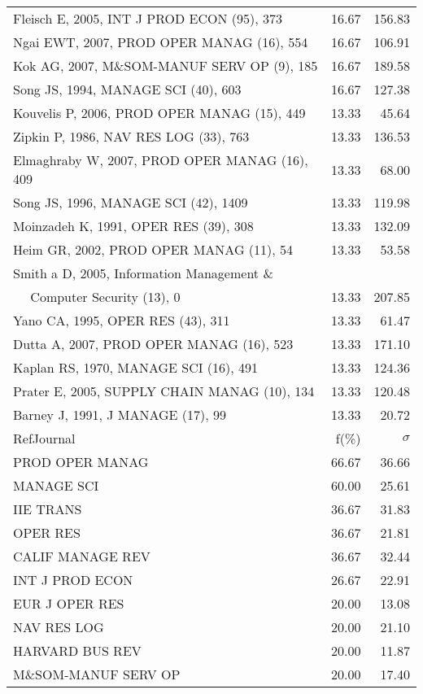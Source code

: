 \documentclass[a4paper,11pt]{report}
\begin{document}
\begin{landscape}
\begin{table}[!ht]
{\begin{tabular}{|l r r|}
Fleisch E, 2005, INT J PROD ECON (95), 373 & 16.67 & 156.83\\
Ngai EWT, 2007, PROD OPER MANAG (16), 554 & 16.67 & 106.91\\
Kok AG, 2007, M\&SOM-MANUF SERV OP (9), 185 & 16.67 & 189.58\\
Song JS, 1994, MANAGE SCI (40), 603 & 16.67 & 127.38\\
Kouvelis P, 2006, PROD OPER MANAG (15), 449 & 13.33 & 45.64\\
Zipkin P, 1986, NAV RES LOG (33), 763 & 13.33 & 136.53\\
Elmaghraby W, 2007, PROD OPER MANAG (16), 409 & 13.33 & 68.00\\
Song JS, 1996, MANAGE SCI (42), 1409 & 13.33 & 119.98\\
Moinzadeh K, 1991, OPER RES (39), 308 & 13.33 & 132.09\\
Heim GR, 2002, PROD OPER MANAG (11), 54 & 13.33 & 53.58\\
Smith a D, 2005, Information Management \& &  & \\
$\quad$ Computer Security (13), 0 & 13.33 & 207.85\\
Yano CA, 1995, OPER RES (43), 311 & 13.33 & 61.47\\
Dutta A, 2007, PROD OPER MANAG (16), 523 & 13.33 & 171.10\\
Kaplan RS, 1970, MANAGE SCI (16), 491 & 13.33 & 124.36\\
Prater E, 2005, SUPPLY CHAIN MANAG (10), 134 & 13.33 & 120.48\\
Barney J, 1991, J MANAGE (17), 99 & 13.33 & 20.72\\
\hline
\hline
RefJournal & f(\%) & $\sigma$\\
\hline
PROD OPER MANAG & 66.67 & 36.66\\
MANAGE SCI & 60.00 & 25.61\\
IIE TRANS & 36.67 & 31.83\\
OPER RES & 36.67 & 21.81\\
CALIF MANAGE REV & 36.67 & 32.44\\
INT J PROD ECON & 26.67 & 22.91\\
EUR J OPER RES & 20.00 & 13.08\\
NAV RES LOG & 20.00 & 21.10\\
HARVARD BUS REV & 20.00 & 11.87\\
M\&SOM-MANUF SERV OP & 20.00 & 17.40\\
\hline
\end{tabular}
}
\end{table}

\end{landscape}
\end{document}
